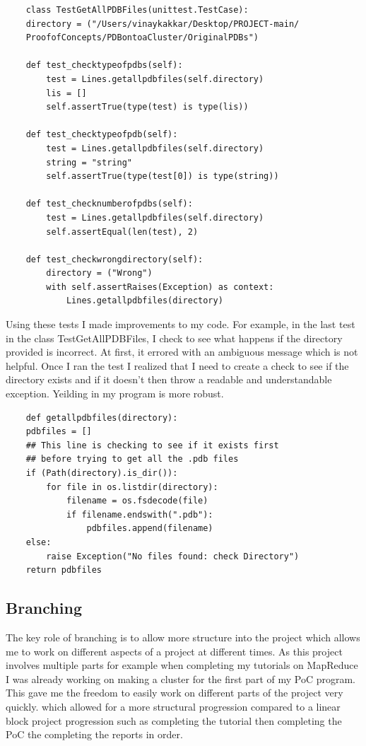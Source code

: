 \documentclass{report}
\begin{document}
\begin{lstlisting}
    class TestGetAllPDBFiles(unittest.TestCase):
    directory = ("/Users/vinaykakkar/Desktop/PROJECT-main/
    ProofofConcepts/PDBontoaCluster/OriginalPDBs")

    def test_checktypeofpdbs(self):
        test = Lines.getallpdbfiles(self.directory)
        lis = []
        self.assertTrue(type(test) is type(lis))
    
    def test_checktypeofpdb(self):
        test = Lines.getallpdbfiles(self.directory)
        string = "string"
        self.assertTrue(type(test[0]) is type(string))

    def test_checknumberofpdbs(self):
        test = Lines.getallpdbfiles(self.directory)
        self.assertEqual(len(test), 2)

    def test_checkwrongdirectory(self):
        directory = ("Wrong")
        with self.assertRaises(Exception) as context:
            Lines.getallpdbfiles(directory)

\end{lstlisting}

Using these tests I made improvements to my code. For example, in the last test in the class TestGetAllPDBFiles, I check to see what happens if the directory provided is incorrect. At first, it errored with an ambiguous message which is not helpful. Once I ran the test I realized that I need to create a check to see if the directory exists and if it doesn't then throw a readable and understandable exception. Yeilding in my program is more robust.

\begin{lstlisting}
    def getallpdbfiles(directory):
    pdbfiles = []
    ## This line is checking to see if it exists first 
    ## before trying to get all the .pdb files
    if (Path(directory).is_dir()):
        for file in os.listdir(directory):
            filename = os.fsdecode(file)
            if filename.endswith(".pdb"):
                pdbfiles.append(filename)
    else:
        raise Exception("No files found: check Directory")
    return pdbfiles

\end{lstlisting}


\subsection{Branching}

The key role of branching is to allow more structure into the project which allows me to work on different aspects of a project at different times. As this project involves multiple parts for example when completing my tutorials on MapReduce I was already working on making a cluster for the first part of my PoC program. This gave me the freedom to easily work on different parts of the project very quickly. which allowed for a more structural progression compared to a linear block project progression such as completing the tutorial then completing the PoC the completing the reports in order.
\end{document}
